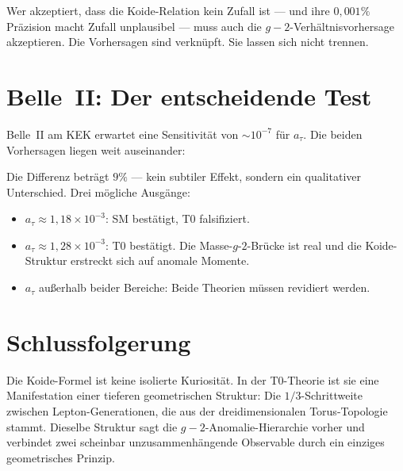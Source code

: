Wer akzeptiert, dass die Koide-Relation kein Zufall ist — und ihre $0{,}001\%$ Präzision macht Zufall unplausibel — muss auch die $g-2$-Verhältnisvorhersage akzeptieren. Die Vorhersagen sind verknüpft. Sie lassen sich nicht trennen.

\section{Belle~II: Der entscheidende Test}

Belle~II am KEK erwartet eine Sensitivität von $\sim 10^{-7}$ für $a_\tau$. Die beiden Vorhersagen liegen weit auseinander:

\begin{table}[h]
	\centering
	\caption{Tau-Anomalie-Vorhersagen — Belle~II wird unterscheiden}
\end{table}

Die Differenz beträgt $9\%$ — kein subtiler Effekt, sondern ein qualitativer Unterschied. Drei mögliche Ausgänge:
\begin{itemize}
	\item $a_\tau \approx 1{,}18 \times 10^{-3}$: SM bestätigt, T0 falsifiziert.
	\item $a_\tau \approx 1{,}28 \times 10^{-3}$: T0 bestätigt. Die Masse-$g$-$2$-Brücke ist real und die Koide-Struktur erstreckt sich auf anomale Momente.
	\item $a_\tau$ außerhalb beider Bereiche: Beide Theorien müssen revidiert werden.
\end{itemize}

\section{Schlussfolgerung}

Die Koide-Formel ist keine isolierte Kuriosität. In der T0-Theorie ist sie eine Manifestation einer tieferen geometrischen Struktur: Die $1/3$-Schrittweite zwischen Lepton-Generationen, die aus der dreidimensionalen Torus-Topologie stammt. Dieselbe Struktur sagt die $g-2$-Anomalie-Hierarchie vorher und verbindet zwei scheinbar unzusammenhängende Observable durch ein einziges geometrisches Prinzip.

